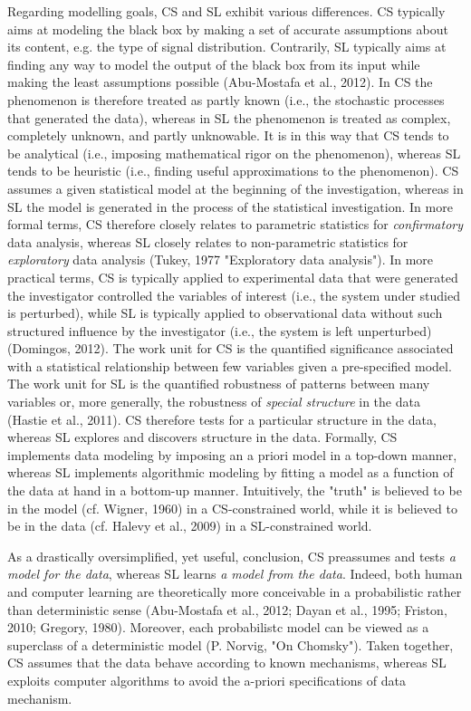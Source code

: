 \documentclass[authoryear,review,3p]{elsarticle}
\begin{document}
Regarding modelling goals, CS and SL exhibit various differences.
CS typically aims at modeling the black box by making a set of
accurate assumptions about its content,
e.g. the type of signal distribution.
Contrarily, SL typically aims at finding any way to model
the output of the black box from its input
while making the least assumptions possible (Abu-Mostafa et al., 2012).
In CS the phenomenon is therefore treated as partly known
(i.e., the stochastic processes that generated the data),
whereas in SL the phenomenon is treated as complex,
completely unknown, and partly unknowable.
It is in this way that CS tends to be
analytical
(i.e., imposing mathematical rigor on the phenomenon),
whereas SL tends to be
heuristic
(i.e., finding useful approximations to the phenomenon).
CS assumes a given statistical model at the beginning of the investigation,
whereas in SL the model is
generated in the process of the statistical investigation.
In more formal terms,
CS therefore closely relates to parametric statistics
for \textit{confirmatory} data analysis,
whereas SL closely relates to non-parametric statistics
for \textit{exploratory} data analysis
(Tukey, 1977 "Exploratory data analysis").
In more practical terms, CS is typically applied to experimental data
that were generated
the investigator controlled the variables of interest 
(i.e., the system under studied is perturbed),
while SL is typically applied to observational
data without such structured influence by the investigator
(i.e., the system is left unperturbed) (Domingos, 2012).
The work unit for CS is the quantified
significance associated with a statistical
relationship between few variables given a pre-specified model.
The work unit for SL is the quantified robustness of patterns
between many variables or, more generally,
the robustness of \textit{special structure} in the data (Hastie et al., 2011).
CS therefore tests for a particular structure in the data,
whereas SL explores and discovers structure in the data.
Formally, CS implements data modeling by
imposing an a priori model in a top-down manner,
whereas SL implements algorithmic modeling by fitting
a model as a function of the data at hand in a bottom-up manner.
%
Intuitively, the "truth" is believed
to be in the model (cf. Wigner, 1960) in a CS-constrained world,
while it is believed to be in the data
(cf. Halevy et al., 2009) in a SL-constrained world.


As a drastically oversimplified, yet useful, conclusion,
CS preassumes and tests \textit{a model for the data},
whereas SL learns \textit{a model from the data}.
%
Indeed,
both human and computer learning are theoretically
more conceivable in a probabilistic rather than
deterministic sense
(Abu-Mostafa et al., 2012; Dayan et al., 1995; Friston, 2010; Gregory, 1980).
Moreover, each probabilistc model can be viewed as a superclass
of a deterministic model (P. Norvig, "On Chomsky").
%
Taken together,
CS assumes that the data behave according to known mechanisms,
whereas SL exploits
computer algorithms to avoid the a-priori
specifications of data mechanism.
\end{document}
